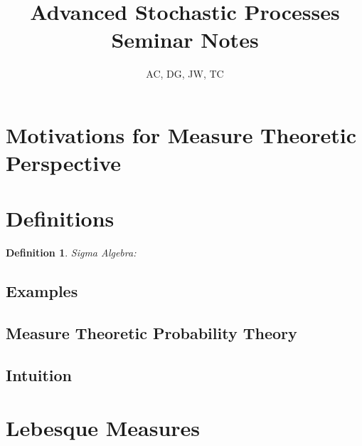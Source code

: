 \documentclass[10pt, oneside]{article}
\title{Advanced Stochastic Processes Seminar Notes}
\author{AC, DG, JW, TC}
\newtheorem{defn}{Definition}
\begin{document}
\maketitle
\tableofcontents

\vspace{.25in}

\section{Motivations for Measure Theoretic Perspective}

\section{Definitions}
\begin{defn}
   Sigma Algebra:  
\end{defn} 

\subsection{Examples}

\subsection{Measure Theoretic Probability Theory}

\subsection{Intuition}

\section{Lebesque Measures}
\end{document}
